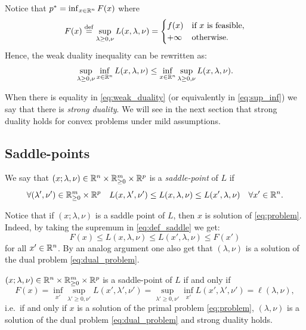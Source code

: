 \documentclass[11pt,nocut]{article}
\begin{document}
Notice that $p^* = \inf_{x \in \mathbb{R}^n} F(x)$ where
$$
F(x) \overset{\rm def}{=}
\sup_{\lambda \geq 0, \nu} L(x,\lambda,\nu)
=
\begin{cases}
	f(x) & \text{if} \ x \ \text{is feasible},\\
	+ \infty & \text{otherwise.}
\end{cases}
$$
Hence, the weak duality inequality can be rewritten as:
\begin{equation}\label{eq:sup_inf}
	\sup_{\lambda \geq 0, \nu} \inf_{x \in \mathbb{R}^n} L(x,\lambda,\nu) \leq \inf_{x \in \mathbb{R}^n} \sup_{\lambda \geq 0, \nu} L(x,\lambda,\nu).
\end{equation}

When there is equality in \eqref{eq:weak_duality} (or equivalently in \eqref{eq:sup_inf}) we say that there is \emph{strong duality}. We will see in the next section that strong duality holds for convex problems under mild assumptions.


\subsection{Saddle-points}
\begin{definition}
	We say that $(x; \lambda,\nu) \in \mathbb{R}^n \times \mathbb{R}_{\geq 0}^m \times \mathbb{R}^p$ is a \emph{saddle-point} of $L$ if
	\begin{equation}\label{eq:def_saddle}
	\forall (\lambda',\nu') \in \mathbb{R}_{\geq 0}^m \times \mathbb{R}^p \quad
	L(x,\lambda',\nu') \leq L(x,\lambda,\nu) \leq L(x',\lambda,\nu) \quad \forall x' \in \mathbb{R}^n.
\end{equation}
\end{definition}

Notice that if $(x; \lambda,\nu)$ is a saddle point of $L$, then $x$ is solution of \eqref{eq:problem}. Indeed, by taking the supremum in \eqref{eq:def_saddle} we get:
$$
F(x) \leq L(x,\lambda,\nu) \leq L(x',\lambda,\nu) \leq F(x')
$$
for all $x' \in \mathbb{R}^n$. By an analog argument one also get that $(\lambda,\nu)$ is a solution of the dual problem \eqref{eq:dual_problem}.

\begin{theorem}\label{th:saddle}
	$(x; \lambda,\nu) \in \mathbb{R}^n \times \mathbb{R}_{\geq 0}^m \times \mathbb{R}^p$ is a saddle-point of $L$ if and only if
	\begin{equation}\label{eq:th_saddle}
	F(x)
	= 
	\inf_{x'}\sup_{\lambda' \geq 0, \nu'} L(x',\lambda',\nu')
	=
	\sup_{\lambda' \geq 0, \nu'}
	\inf_{x'}
	L(x',\lambda',\nu') 
	= \ell(\lambda,\nu),
	\end{equation}
	i.e.\ if and only if $x$ is a solution of the primal problem \eqref{eq:problem}, $(\lambda,\nu)$ is a solution of the dual problem \eqref{eq:dual_problem} and strong duality holds.
\end{theorem}
\end{document}
